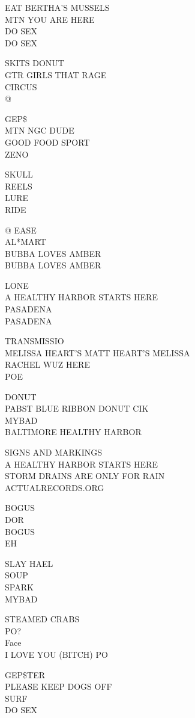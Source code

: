 \documentclass[10pt,letterpaper]{article}
\begin{document}
EAT BERTHA'S MUSSELS\\
MTN YOU ARE HERE\\
DO SEX\\
DO SEX

SKITS DONUT\\
GTR GIRLS THAT RAGE\\
CIRCUS\\
@

GEP\$\\
MTN NGC DUDE\\
GOOD FOOD SPORT\\
ZENO

SKULL\\
REELS\\
LURE\\
RIDE

@ EASE\\
AL*MART\\
BUBBA LOVES AMBER\\
BUBBA LOVES AMBER

LONE\\
A HEALTHY HARBOR STARTS HERE\\
PASADENA\\
PASADENA

TRANSMISSIO\\
MELISSA HEART'S MATT HEART'S MELISSA\\
RACHEL WUZ HERE\\
POE

DONUT\\
PABST BLUE RIBBON DONUT CIK\\
MYBAD\\
BALTIMORE HEALTHY HARBOR

SIGNS AND MARKINGS\\
A HEALTHY HARBOR STARTS HERE\\
STORM DRAINS ARE ONLY FOR RAIN\\
ACTUALRECORDS.ORG

BOGUS\\
DOR\\
BOGUS\\
EH

SLAY HAEL\\
SOUP\\
SPARK\\
MYBAD

STEAMED CRABS\\
PO?\\
Face\\
I LOVE YOU (BITCH) PO

GEP\$TER\\
PLEASE KEEP DOGS OFF\\
SURF\\
DO SEX
\end{document}
